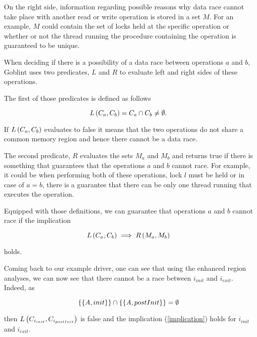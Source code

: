 \documentclass[..thesis.tex]{subfiles}
\begin{document}
On the right side, information regarding possible reasons why data race cannot take place with another read or write operation is stored in a set $M$.
 For an example, $M$ could contain the set of locks held at the specific operation or whether or not the thread running the procedure containing the operation is guaranteed to be unique.

When deciding if there is a possibility of a data race between operations $a$ and $b$, Goblint uses two predicates, $L$ and $R$ to evaluate left and right sides of these operations. 

The first of those predicates is defined as follows

\begin{equation*}
L \left( C_a, C_b \right) =  C_a \cap C_b \neq \emptyset \text{.}
\end{equation*}

If $L \left( C_a, C_b \right)$ evaluates to false it means that the two operations do not share a common memory region and hence there cannot be a data race. 

The second predicate, $R$ evaluates the sets $M_a$ and $M_b$ and returns true if there is something that guarantees that the operations $a$ and $b$ cannot race.
 For example, it could be when performing both of these operations, lock $l$ must be held or in case of $a=b$,
 there is a guarantee that there can be only one thread running that executes the operation.

Equipped with those definitions, we can guarantee that operations $a$ and $b$ cannot race if the implication

\begin{equation}
\label{implication}
L \left( C_a, C_b \right) \implies R \left( M_a, M_b \right)  
\end{equation}

holds.

Coming back to our example driver, one can see that using the enhanced region analyses, we can now see that there cannot be a race between $i_{init}$ and $i_{exit}$.
Indeed, as


\begin{equation*}
 \left\lbrace \left\lbrace A, init \right\rbrace \right\rbrace \cap  \left\lbrace \left\lbrace A, postInit \right\rbrace \right\rbrace = \emptyset
\end{equation*}

then $L \left( C_{i_{init}}, C_{i_{postInit}} \right)$ is false and the implication (\ref{implication}) holds for $i_{init}$ and $i_{exit}$.
\end{document}
